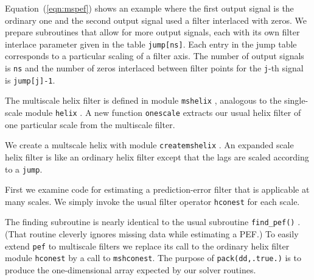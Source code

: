 \par
Equation~(\ref{eqn:mspef}) shows an example
where the first output signal is the ordinary one
and the second output signal used a filter interlaced with zeros.
We prepare subroutines that allow for more output signals,
each with its own filter interlace parameter
given in the table {\tt jump[ns]}.
Each entry in the jump table corresponds to
a particular scaling of a filter axis.
The number of output signals is {\tt ns} and the
number of zeros interlaced between filter points 
for the {\tt j}-th signal is {\tt jump[j]-1}.
\par
The multiscale helix filter is defined in module
\texttt{mshelix} , analogous to the
single-scale module \texttt{helix} .
A new function
\texttt{onescale}
extracts our usual helix filter
of one particular scale
from the multiscale filter.


We create a multscale helix with module
\texttt{createmshelix} .
An expanded scale helix filter is like an ordinary helix filter
except that the lags are scaled according to a \texttt{jump}.


\par
First we examine code for estimating a prediction-error filter
that is applicable at many scales.
We simply invoke the usual filter operator
\texttt{hconest} 
for each scale.




\par
The  finding subroutine
is nearly identical to the usual subroutine
\texttt{find\_pef()} .
(That routine cleverly ignores missing data while estimating a PEF.)
To easily extend {\tt pef} to multiscale filters
we replace its call to the ordinary helix
filter module
\texttt{hconest} 
by a call to \texttt{mshconest}.
The purpose of \texttt{pack(dd,.true.)}
is to produce the one-dimensional array expected by
our solver routines.


